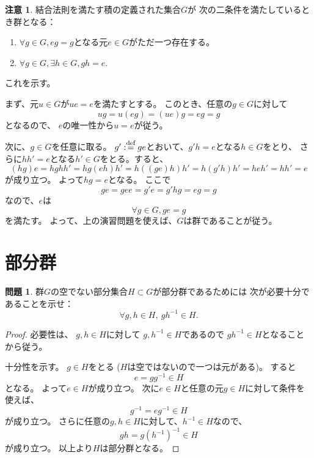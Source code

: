 \documentclass[uplatex]{jsreport}
\theoremstyle{definition}
\newtheorem{prob}[prob]{問題}
\newtheorem*{rem*}{注意}
\newcommand{\dfn}{:\overset{\mbox{{\scriptsize def}}}{=}}
\begin{document}
\begin{rem*}
  結合法則を満たす積の定義された集合\(G\)が
  次の二条件を満たしているとき群となる：
  \begin{enumerate}
    \item
    \(\forall g\in G, eg = g\)となる元\(e\in G\)がただ一つ存在する。
    \item
    \(\forall g\in G, \exists h\in G, gh = e\).
  \end{enumerate}
  これを示す。

  まず、元\(u\in G\)が\(ue = e\)を満たすとする。
  このとき、任意の\(g\in G\)に対して
  \[ug = u(eg) = (ue)g = eg = g\]
  となるので、
  \(e\)の唯一性から\(u=e\)が従う。

  次に、\(g\in G\)を任意に取る。
  \(g'\dfn ge\)とおいて、\(g'h=e\)となる\(h\in G\)をとり、
  さらに\(hh'=e\)となる\(h'\in G\)をとる。すると、
  \[
  (hg)e = hghh' = hg(eh)h' = h((ge)h)h' = h(g'h)h' = heh' = hh' = e
  \]
  が成り立つ。
  よって\(hg = e\)となる。
  ここで
  \[
  ge = gee = g'e = g'hg = eg = g
  \]
  なので、\(e\)は
  \[
  \forall g\in G, ge = g
  \]
  を満たす。
  よって、上の演習問題を使えば、\(G\)は群であることが従う。
\end{rem*}






\section{部分群}


\begin{prob}
  群\(G\)の空でない部分集合\(H\subset G\)が部分群であるためには
  次が必要十分であることを示せ：
  \[
  \forall g,h\in H, \ gh^{-1}\in H.
  \]
\end{prob}

\begin{proof}
  必要性は、
  \(g,h\in H\)に対して
  \(g,h^{-1}\in H\)であるので
  \(gh^{-1}\in H\)となることから従う。

  十分性を示す。
  \(g\in H\)をとる (\(H\)は空ではないので一つは元がある)。
  すると
  \[e = gg^{-1}\in H\]
  となる。
  よって\(e\in H\)が成り立つ。
  次に\(e\in H\)と任意の元\(g\in H\)に対して条件を使えば、
  \[g^{-1} = eg^{-1}\in H\]
  が成り立つ。
  さらに任意の\(g,h\in H\)に対して、\(h^{-1}\in H\)なので、
  \[gh = g(h^{-1})^{-1}\in H\]
  が成り立つ。
  以上より\(H\)は部分群となる。
\end{proof}
\end{document}
